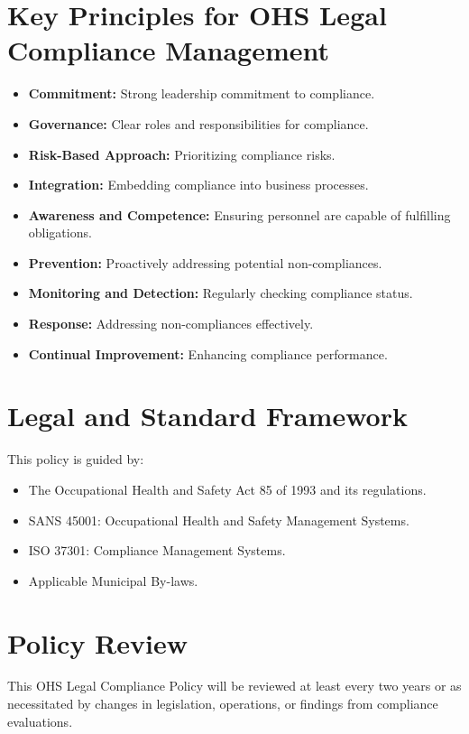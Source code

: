 \documentclass[12pt]{article}
\begin{document}
\section{Key Principles for OHS Legal Compliance Management}
\begin{itemize}
    \item \textbf{Commitment:} Strong leadership commitment to compliance.
    \item \textbf{Governance:} Clear roles and responsibilities for compliance.
    \item \textbf{Risk-Based Approach:} Prioritizing compliance risks.
    \item \textbf{Integration:} Embedding compliance into business processes.
    \item \textbf{Awareness and Competence:} Ensuring personnel are capable of fulfilling obligations.
    \item \textbf{Prevention:} Proactively addressing potential non-compliances.
    \item \textbf{Monitoring and Detection:} Regularly checking compliance status.
    \item \textbf{Response:} Addressing non-compliances effectively.
    \item \textbf{Continual Improvement:} Enhancing compliance performance.
\end{itemize}

\section{Legal and Standard Framework}
This policy is guided by:
\begin{itemize}
    \item The Occupational Health and Safety Act 85 of 1993 and its regulations.
    \item SANS 45001: Occupational Health and Safety Management Systems.
    \item ISO 37301: Compliance Management Systems.
    \item Applicable Municipal By-laws.
\end{itemize}

\section{Policy Review}
This OHS Legal Compliance Policy will be reviewed at least every two years or as necessitated by changes in legislation, operations, or findings from compliance evaluations.
\end{document}
